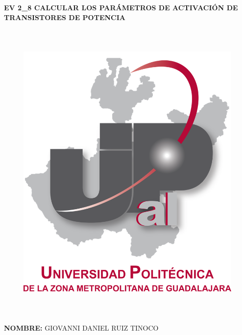 \documentclass[12pt]{article}
\begin{document}
\begin{Center}
\textbf{EV 2\_8 CALCULAR LOS PARÁMETROS DE ACTIVACIÓN DE TRANSISTORES DE POTENCIA}
\end{Center}\par




\begin{figure}[H]
	\begin{Center}
		\includegraphics[width=5.24in,height=6.06in]{./media/image1.png}
	\end{Center}
\end{figure}



\par


\vspace{\baselineskip}
\begin{Center}
\textbf{NOMBRE: }GIOVANNI DANIEL RUIZ TINOCO
\end{Center}\par
\end{document}

